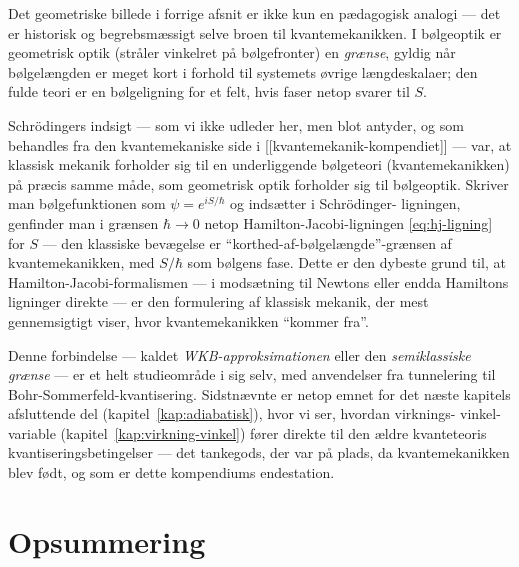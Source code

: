 Det geometriske billede i forrige afsnit er ikke kun en pædagogisk
analogi — det er historisk og begrebsmæssigt selve broen til
kvantemekanikken. I bølgeoptik er geometrisk optik (stråler vinkelret
på bølgefronter) en \emph{grænse}, gyldig når bølgelængden er meget
kort i forhold til systemets øvrige længdeskalaer; den fulde teori er
en bølgeligning for et felt, hvis faser netop svarer til $S$.

Schrödingers indsigt — som vi ikke udleder her, men blot antyder, og
som behandles fra den kvantemekaniske side i
[[kvantemekanik-kompendiet]] — var, at klassisk mekanik forholder sig
til en underliggende bølgeteori (kvantemekanikken) på præcis samme
måde, som geometrisk optik forholder sig til bølgeoptik. Skriver man
bølgefunktionen som $\psi=e^{iS/\hbar}$ og indsætter i Schrödinger-
ligningen, genfinder man i grænsen $\hbar\to0$ netop
Hamilton-Jacobi-ligningen \eqref{eq:hj-ligning} for $S$ — den klassiske
bevægelse er ``korthed-af-bølgelængde''-grænsen af kvantemekanikken, med
$S/\hbar$ som bølgens fase. Dette er den dybeste grund til, at
Hamilton-Jacobi-formalismen — i modsætning til Newtons eller endda
Hamiltons ligninger direkte — er den formulering af klassisk mekanik,
der mest gennemsigtigt viser, hvor kvantemekanikken ``kommer fra''.

\begin{bemaerkning}
Denne forbindelse — kaldet \emph{WKB-approksimationen} eller den
\emph{semiklassiske grænse} — er et helt studieområde i sig selv, med
anvendelser fra tunnelering til Bohr-Sommerfeld-kvantisering.
Sidstnævnte er netop emnet for det næste kapitels afsluttende del
(kapitel~\ref{kap:adiabatisk}), hvor vi ser, hvordan virknings-
vinkel-variable (kapitel~\ref{kap:virkning-vinkel}) fører direkte til
den ældre kvanteteoris kvantiseringsbetingelser — det tankegods, der
var på plads, da kvantemekanikken blev født, og som er dette
kompendiums endestation.
\end{bemaerkning}

\section{Opsummering}

